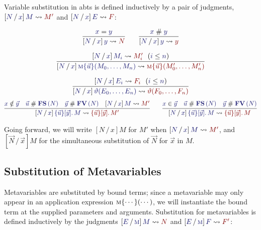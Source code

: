 \documentclass[11pt]{article}
\theoremstyle{definition}
\theoremstyle{remark}
\numberwithin{equation}{section}
\def\IModeColorName{MidnightBlue}
\def\OModeColorName{Maroon}
\newcommand\IMode[1]{{\color{\IModeColorName}{#1}}}
\newcommand\OMode[1]{{\color{\OModeColorName}{#1}}}
\newcommand\HypJ[2]{#1\ \ (#2)}
\newcommand\Member[2]{\IMode{#1}\in\IMode{#2}}
\newcommand\MkBTm[3]{\{#1\}[#2].\, #3}
\newcommand\Leq[2]{\IMode{#1}\leq\IMode{#2}}
\newcommand\MV[1]{\textsc{#1}}
\newcommand\MApp[3]{#1\{#2\}(#3)}
\newcommand\App[2]{#1(#2)}
\newcommand\FV[1]{\mathbf{FV}\left(#1\right)}
\newcommand\FS[1]{\mathbf{FS}\left(#1\right)}
\newcommand\NotIn[2]{\IMode{#1}\notin\IMode{#2}}
\newcommand\Subst[3]{
  \left[#1\, /\, #2\right]#3%
}
\newcommand\IsSubst[4]{%
  \Subst{\IMode{#1}}{\IMode{#2}}{\IMode{#3}}%
  \leadsto\OMode{#4}%
}
\newcommand\IsEq[2]{\IMode{#1} = \IMode{#2}}
\newcommand\IsApart[2]{\IMode{#1} \mathrel{\#} \IMode{#2}}
\begin{document}
Variable substitution in abts is defined inductively by a
pair of judgments, $\IsSubst{N}{x}{M}{M'}$ and $\IsSubst{N}{x}{E}{F}$:

\begin{gather*}
  \infer{
    \IsSubst{N}{x}{y}{N}
  }{
    \IsEq{x}{y}
  }\qquad
  \infer{
    \IsSubst{N}{x}{y}{y}
  }{
    \IsApart{x}{y}
  }\\[6pt]
  \infer{
    \IsSubst{N}{x}{
      \MApp{\MV{m}}{\vec{u}}{M_0,\dots,M_n}
    }{
      \MApp{\MV{m}}{\vec{u}}{M'_0,\dots,M'_n}
    }
  }{
    \HypJ{
      \IsSubst{N}{x}{M_i}{M'_i}
    }{
      \Leq{i}{n}
    }
  }\\[6pt]
  \infer{
    \IsSubst{N}{x}{
      \App{\vartheta}{E_0,\dots,E_n}
    }{
      \App{\vartheta}{F_0,\dots,F_n}
    }
  }{
    \HypJ{
      \IsSubst{N}{x}{E_i}{F_i}
    }{
      \Leq{i}{n}
    }
  }
\end{gather*}
\begin{gather*}
  \infer{
    \IsSubst{N}{x}{
      \MkBTm{\vec{u}}{\vec{y}}{M}
    }{
      \MkBTm{\vec{u}}{\vec{y}}{M'}
    }
  }{
    \NotIn{x}{\vec{y}} &
    \IsApart{\vec{u}}{\FS{N}} &
    \IsApart{\vec{y}}{\FV{N}} &
    \IsSubst{N}{x}{M}{M'}
  }\qquad
  \infer{
    \IsSubst{N}{x}{
      \MkBTm{\vec{u}}{\vec{y}}{M}
    }{
      \MkBTm{\vec{u}}{\vec{y}}{M}
    }
  }{
    \Member{x}{\vec{y}} &
    \IsApart{\vec{u}}{\FS{N}} &
    \IsApart{\vec{y}}{\FV{N}}
  }
\end{gather*}

Going forward, we will write $\Subst{N}{x}{M}$ for $M'$ when
$\IsSubst{N}{x}{M}{M'}$, and $\Subst{\vec{N}}{\vec{x}}{M}$ for the
simultaneous substitution of $\vec{N}$ for $\vec{x}$ in $M$.

\subsection{Substitution of Metavariables}

Metavariables are substituted by bound terms; since a metavariable may only
appear in an application expression $\MApp{\MV{m}}{\cdots}{\cdots}$, we will
instantiate the bound term at the supplied parameters and arguments.
Substitution for metavariables is defined inductively by the judgments
$\IsSubst{E}{\MV{m}}{M}{N}$ and $\IsSubst{E}{\MV{m}}{F}{F'}$:
\end{document}
